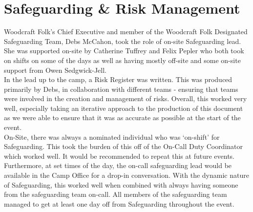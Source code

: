\chapter{Safeguarding \& Risk Management}
Woodcraft Folk's Chief Executive and member of the Woodcraft Folk Designated Safeguarding Team, Debs McCahon, took the role of on-site Safeguarding lead. She was supported on-site by Catherine Tuffrey and Felix Pepler who both took on shifts on some of the days as well as having mostly off-site and some on-site support from Owen Sedgwick-Jell.\\

In the lead up to the camp, a Risk Register was written. This was produced primarily by Debs, in collaboration with different teams - ensuring that teams were involved in the creation and management of risks. Overall, this worked very well, especially taking an iterative approach to the production of this document as we were able to ensure that it was as accurate as possible at the start of the event. \\

On-Site, there was always a nominated individual who was `on-shift' for Safeguarding. This took the burden of this off of the On-Call Duty Coordinator which worked well. It would be recommended to repeat this at future events. Furthermore, at set times of the day, the on-call safeguarding lead would be available in the Camp Office for a drop-in conversation. With the dynamic nature of Safeguarding, this worked well when combined with always having someone from the safeguarding team on-call. All members of the safeguarding team managed to get at least one day off from Safeguarding throughout the event.


